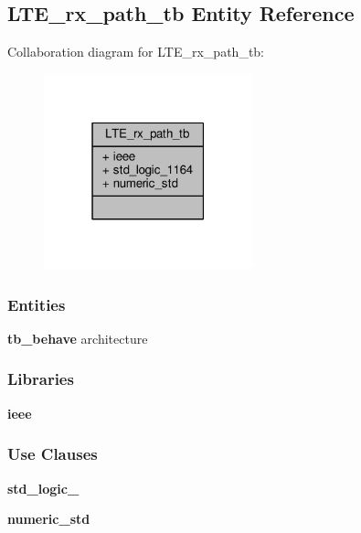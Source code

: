 \subsection{L\+T\+E\+\_\+rx\+\_\+path\+\_\+tb Entity Reference}
\label{classLTE__rx__path__tb}


Collaboration diagram for L\+T\+E\+\_\+rx\+\_\+path\+\_\+tb\+:\nopagebreak
\begin{figure}[H]
\begin{center}
\leavevmode
\includegraphics[width=171pt]{d8/ddb/classLTE__rx__path__tb__coll__graph}
\end{center}
\end{figure}
\subsubsection*{Entities}
\begin{DoxyCompactItemize}
\item 
{\bf tb\+\_\+behave} architecture
\end{DoxyCompactItemize}
\subsubsection*{Libraries}
 \begin{DoxyCompactItemize}
\item 
{\bf ieee} 
\end{DoxyCompactItemize}
\subsubsection*{Use Clauses}
 \begin{DoxyCompactItemize}
\item 
{\bf std\+\_\+logic\+\_}   
\item 
{\bf numeric\+\_\+std}   
\end{DoxyCompactItemize}


